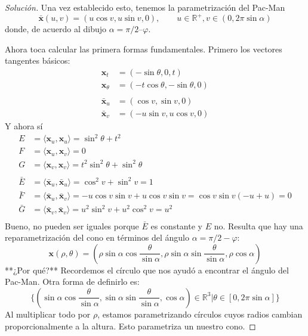 \documentclass[spanish]{book}
\theoremstyle{definition}
\newcommand{\R}{\mathbb{R}}
\begin{document}
\begin{proof}[Solución]
	Una vez establecido esto, tenemos la parametrización del Pac-Man
	\[\mathbf{\bar{x}}(u,v)=(u\cos{v},u\sin v,0),\qquad u\in\R^+,v\in(0,2\pi\sin\alpha)\]
	donde, de acuerdo al dibujo $\alpha=\pi/2–\varphi$.
	
	Ahora toca calcular las primera formas fundamentales. Primero los vectores tangentes básicos:
	\begin{align*}
		\mathbf{x}_t&=(-\sin\theta,0,t)\\
		\mathbf{x}_\theta&=(-t\cos\theta,-\sin\theta,0)\\ \\
		\mathbf{\bar{x}}_u&=(\cos{v},\sin{v},0)\\
		\mathbf{\bar{x}}_v&=(-u\sin{v},u\cos{v},0)
	\end{align*}
	Y ahora sí
	\begin{align*}
		{E}&=\langle \mathbf{{x}}_u,\mathbf{{x}}_u\rangle=\sin^2{\theta}+t^2\\
		{F}&=\langle \mathbf{{x}}_u,\mathbf{{x}}_v\rangle=0\\
		{G}&=\langle \mathbf{{x}}_v,\mathbf{{x}}_v\rangle=t^2\sin^2{\theta}+\sin^2{\theta}\\\\
		\bar{E}&=\langle \mathbf{\bar{x}}_u,\mathbf{\bar{x}}_u\rangle=\cos^2{v}+\sin^2{v}=1\\
		\bar{F}&=\langle \mathbf{\bar{x}}_u,\mathbf{\bar{x}}_v\rangle=-u\cos{v}\sin{v}+u\cos{v}\sin{v}=\cos{v}\sin{v}(-u+u)=0\\
		\bar{G}&=\langle \mathbf{\bar{x}}_v,\mathbf{\bar{x}}_v\rangle=u^2\sin^2{v}+u^2\cos^2{v}=u^2\\
	\end{align*}
	Bueno, no pueden ser iguales porque $\bar{E}$ es constante y $E$ no. Resulta que hay una reparametrización del cono en términos del ángulo $\alpha=\pi/2-\varphi$:
	\[\mathbf{x}(\rho,\theta)=(\rho\sin\alpha\cos{\frac{\theta}{\sin{\alpha}}},\rho\sin\alpha\sin{\frac{\theta}{\sin{\alpha}}},\rho\cos\alpha)\]
	**¿Por qué?** Recordemos el círculo que nos ayudó a encontrar el ángulo del Pac-Man. Otra forma de definirlo es:
	\[\{(\sin\alpha\cos\frac{\theta}{\sin\alpha},\sin\alpha\sin{\frac{\theta}{\sin\alpha}},\cos\alpha)\in\mathbb{R}^3|\theta\in[0,2\pi\sin\alpha]\}\]
	Al multiplicar todo por $\rho$, estamos parametrizando círculos cuyos radios cambian proporcionalmente a la altura. Esto parametriza un nuestro cono.
	

\end{proof}
\end{document}

